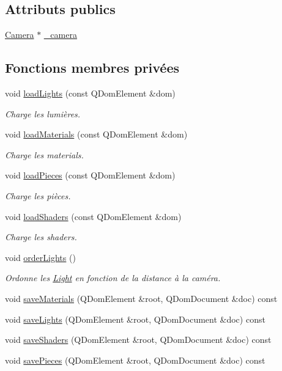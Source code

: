 \subsection*{Attributs publics}
\begin{DoxyCompactItemize}
\item 
\hyperlink{class_camera}{Camera} $\ast$ \hyperlink{class_scene_a8cce9e0f96edc8655a9b9a885e2c26bf}{\+\_\+camera}
\end{DoxyCompactItemize}
\subsection*{Fonctions membres privées}
\begin{DoxyCompactItemize}
\item 
void \hyperlink{class_scene_a34446952ed460f5a66a90649d6f743ec}{load\+Lights} (const Q\+Dom\+Element \&dom)
\begin{DoxyCompactList}\small\item\em Charge les lumières. \end{DoxyCompactList}\item 
void \hyperlink{class_scene_a8fe39b5221775362f28c78129292e162}{load\+Materials} (const Q\+Dom\+Element \&dom)
\begin{DoxyCompactList}\small\item\em Charge les materials. \end{DoxyCompactList}\item 
void \hyperlink{class_scene_aa6d40bab1b160afc7bb84841d056a07d}{load\+Pieces} (const Q\+Dom\+Element \&dom)
\begin{DoxyCompactList}\small\item\em Charge les pièces. \end{DoxyCompactList}\item 
void \hyperlink{class_scene_a1deb5bb022836f4b585c8580246b26cb}{load\+Shaders} (const Q\+Dom\+Element \&dom)
\begin{DoxyCompactList}\small\item\em Charge les shaders. \end{DoxyCompactList}\item 
void \hyperlink{class_scene_ae6fc45f015d96191dbf775d54d6e4437}{order\+Lights} ()
\begin{DoxyCompactList}\small\item\em Ordonne les \hyperlink{class_light}{Light} en fonction de la distance à la caméra. \end{DoxyCompactList}\item 
void \hyperlink{class_scene_a23faaec79e3e47ab7827411f23dd79d9}{save\+Materials} (Q\+Dom\+Element \&root, Q\+Dom\+Document \&doc) const 
\item 
void \hyperlink{class_scene_a13dc69fb963cd556e3029e7ffc55180b}{save\+Lights} (Q\+Dom\+Element \&root, Q\+Dom\+Document \&doc) const 
\item 
void \hyperlink{class_scene_abaec7f89a0a039c5a770ce06e80d96cd}{save\+Shaders} (Q\+Dom\+Element \&root, Q\+Dom\+Document \&doc) const 
\item 
void \hyperlink{class_scene_ab51c69ad1faae20cf5375c3f02b6e7fc}{save\+Pieces} (Q\+Dom\+Element \&root, Q\+Dom\+Document \&doc) const 
\end{DoxyCompactItemize}
